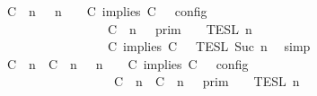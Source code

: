 \begin{isabellebody}
\ {\isacartoucheopen}{\isasymlbrakk}\ {\isacharparenleft}{\isacharparenleft}C\ {\isasymnot}{\isasymUp}\ n{\isacharparenright}\ {\isacharhash}\ {\isasymGamma}{\isacharparenright}{\isacharcomma}\ n\ {\isasymTurnstile}\ {\isasymPsi}\ {\isasymtriangleright}\ {\isacharparenleft}{\isacharparenleft}C\ implies\ C\ {\isacharhash}\ {\isasymPhi}{\isacharparenright}\ {\isasymrbrakk}\isactrlsub c\isactrlsub o\isactrlsub n\isactrlsub f\isactrlsub i\isactrlsub g\isanewline
\ \ \ \ \ \ \ \ \ \ \ \ \ \ \ \ {\isacharequal}\ {\isasymlbrakk}{\isasymlbrakk}\ {\isacharparenleft}C\ {\isasymnot}{\isasymUp}\ n{\isacharparenright}\ {\isacharhash}\ {\isasymGamma}\ {\isasymrbrakk}{\isasymrbrakk}\isactrlsub p\isactrlsub r\isactrlsub i\isactrlsub m\ {\isasyminter}\ {\isasymlbrakk}{\isasymlbrakk}\ {\isasymPsi}\ {\isasymrbrakk}{\isasymrbrakk}\isactrlsub T\isactrlsub E\isactrlsub S\isactrlsub L\isactrlbsup {\isasymge}\ n\isactrlesup \isanewline
\ \ \ \ \ \ \ \ \ \ \ \ \ \ \ \ {\isasyminter}\ {\isasymlbrakk}{\isasymlbrakk}\ {\isacharparenleft}C\ implies\ C\ {\isacharhash}\ {\isasymPhi}\ {\isasymrbrakk}{\isasymrbrakk}\isactrlsub T\isactrlsub E\isactrlsub S\isactrlsub L\isactrlbsup {\isasymge}\ Suc\ n\isactrlesup {\isacartoucheclose}\ \isamarkupfalse%
\ simp\isanewline
\ \ \isamarkupfalse%
\ \isamarkupfalse%
\ {\isacartoucheopen}{\isasymlbrakk}\ {\isacharparenleft}{\isacharparenleft}C\ {\isasymUp}\ n{\isacharparenright}\ {\isacharhash}\ {\isacharparenleft}C\ {\isasymUp}\ n{\isacharparenright}\ {\isacharhash}\ {\isasymGamma}{\isacharparenright}{\isacharcomma}\ n\ {\isasymTurnstile}\ {\isasymPsi}\ {\isasymtriangleright}\ {\isacharparenleft}{\isacharparenleft}C\ implies\ C\ {\isacharhash}\ {\isasymPhi}{\isacharparenright}\ {\isasymrbrakk}\isactrlsub c\isactrlsub o\isactrlsub n\isactrlsub f\isactrlsub i\isactrlsub g\isanewline
\ \ \ \ \ \ \ \ \ \ \ \ \ \ \ \ {\isacharequal}\ \ {\isasymlbrakk}{\isasymlbrakk}\ {\isacharparenleft}{\isacharparenleft}C\ {\isasymUp}\ n{\isacharparenright}\ {\isacharhash}\ {\isacharparenleft}C\ {\isasymUp}\ n{\isacharparenright}\ {\isacharhash}\ {\isasymGamma}{\isacharparenright}\ {\isasymrbrakk}{\isasymrbrakk}\isactrlsub p\isactrlsub r\isactrlsub i\isactrlsub m\ {\isasyminter}\ {\isasymlbrakk}{\isasymlbrakk}\ {\isasymPsi}\ {\isasymrbrakk}{\isasymrbrakk}\isactrlsub T\isactrlsub E\isactrlsub S\isactrlsub L\isactrlbsup {\isasymge}\ n\isactrlesup \isanewline

\end{isabellebody}
